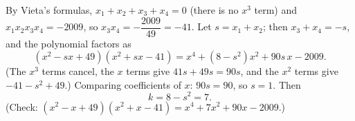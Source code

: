 By Vieta's formulas, $x_1+x_2+x_3+x_4=0$ (there is no $x^3$ term) and $x_1x_2x_3x_4=-2009$, so $x_3x_4=-\dfrac{2009}{49}=-41$. Let $s=x_1+x_2$; then $x_3+x_4=-s$, and the polynomial factors as
\[\left(x^2-sx+49\right)\left(x^2+sx-41\right)=x^4+\left(8-s^2\right)x^2+90s\,x-2009 .\]
(The $x^3$ terms cancel, the $x$ terms give $41s+49s=90s$, and the $x^2$ terms give $-41-s^2+49$.) Comparing coefficients of $x$: $90s=90$, so $s=1$. Then
\[k=8-s^2=\boxed{7}.\]
(Check: $\left(x^2-x+49\right)\left(x^2+x-41\right)=x^4+7x^2+90x-2009$.)
